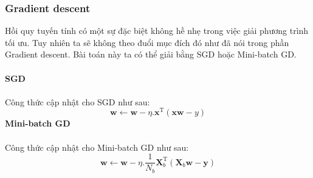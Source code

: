 \documentclass{article}
\begin{document}
\subsubsection*{Gradient descent}
Hồi quy tuyến tính có một sự đặc biệt không hề nhẹ trong việc giải phương trình tối ưu. Tuy nhiên ta sẽ không theo đuổi mục đích đó như đã nói trong phần Gradient descent. Bài toán này ta có thể giải bằng SGD hoặc Mini-batch GD.
\\\\
\textbf{SGD}\\\\
Công thức cập nhật cho SGD như sau:
\begin{equation}
    \textbf{w} \leftarrow \textbf{w} - \eta. \textbf{x}^{\text{T}}(\textbf{x}\textbf{w}-y)
    \label{eq12}
\end{equation}
\textbf{Mini-batch GD}\\\\
Công thức cập nhật cho Mini-batch GD như sau:
\begin{equation}
    \textbf{w} \leftarrow \textbf{w} - \eta. \frac{1}{N_b} \textbf{X}_{b}^{\text{T}}(\textbf{X}_{b}\textbf{w}-\textbf{y})
\end{equation}
\end{document}
